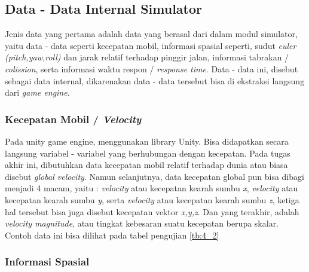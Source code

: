     \subsection{Data - Data Internal Simulator}
    \vspace{1ex}
    Jenis data yang pertama adalah data yang berasal dari dalam modul simulator, yaitu data - data seperti kecepatan mobil, informasi spasial seperti, sudut \textit{euler} \textit{(pitch,yaw,roll)} dan jarak relatif terhadap pinggir jalan, informasi tabrakan / \textit{colission}, serta informasi waktu respon / \textit{response time}. Data - data ini, disebut sebagai data internal, dikarenakan data - data tersebut bisa di ekstraksi langsung dari \textit{game engine}.
    
        \subsubsection{Kecepatan Mobil / \textit{Velocity}}
        
        Pada unity game engine, menggunakan library Unity. Bisa didapatkan secara langsung variabel - variabel yang berhubungan dengan kecepatan. Pada tugas akhir ini, dibutuhkan data kecepatan mobil relatif terhadap dunia atau biasa disebut \textit{global velocity}. Namun selanjutnya, data kecepatan global pun bisa dibagi menjadi 4 macam, yaitu : \textit{velocity} atau kecepatan kearah sumbu \textit{x}, \textit{velocity} atau kecepatan kearah sumbu \textit{y}, serta \textit{velocity} atau kecepatan kearah sumbu \textit{z}, ketiga hal tersebut bisa juga disebut kecepatan vektor \textit{x,y,z}. Dan yang terakhir, adalah \textit{velocity magnitude}, atau tingkat kebesaran suatu kecepatan berupa skalar. Contoh data ini bisa dilihat pada tabel pengujian \ref{tb:4_2}
        
        \subsubsection{Informasi Spasial}
        
